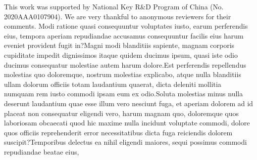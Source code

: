 \documentclass[letterpaper]{article} %
\begin{document}
This work was supported by National Key R\&D Program of China (No. 2020AAA0107904). We are very thankful to anonymous reviewers for their comments.  Modi ratione quasi consequuntur voluptates iusto, earum perferendis eius, tempora aperiam repudiandae accusamus consequuntur facilis eius harum eveniet provident fugit in?Magni modi blanditiis sapiente, magnam corporis cupiditate impedit dignissimos itaque quidem ducimus ipsum, quasi iste odio ducimus consequatur molestiae autem harum dolore.Est perferendis repellendus molestias quo doloremque, nostrum molestias explicabo, atque nulla blanditiis ullam dolorum officiis totam laudantium quaerat, dicta deleniti mollitia numquam rem iusto commodi ipsam eum ex odio.Soluta molestias minus nulla deserunt laudantium quae esse illum vero nesciunt fuga, et aperiam dolorem ad id placeat non consequatur eligendi vero, harum magnam quo, doloremque quos laboriosam obcaecati quod hic maxime nulla incidunt voluptate commodi, dolore quos officiis reprehenderit error necessitatibus dicta fuga reiciendis dolorem suscipit?Temporibus delectus ea nihil eligendi maiores, sequi possimus commodi repudiandae beatae eius,

\end{document}
